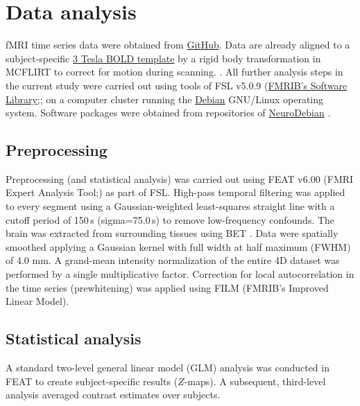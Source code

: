 \documentclass[english]{article}
\begin{document}
\section{Data analysis }
fMRI time series data were obtained from
\href{''https://github.com/psychoinformatics-de/studyforrest-data-aligned''}{GitHub}. Data are already aligned to a subject-specific \href{''https://github.com/psychoinformatics-de/studyforrest-data-templatetransforms''}{3 Tesla BOLD template} by a rigid body transformation in MCFLIRT \citep{jenkinson2002registration} to correct for motion during scanning.
\citep{sengupta2016extension}.
All further analysis steps in the current study were carried out using tools of FSL v5.0.9 (\href{''https://www.fmrib.ox.ac.uk/fsl''}{FMRIB's Software Library};\citep{smith2004fsl}; on a computer cluster running the \href{https://www.debian.org}{Debian} GNU/Linux operating system. Software packages were obtained from repositories of \href{http://neuro.debian.net}{NeuroDebian} \citep{halchenko2012open}.

\subsection{Preprocessing}
Preprocessing (and statistical analysis) was carried out using FEAT v6.00 (FMRI Expert Analysis Tool;\citep{woolrich2001autocorr}) as part of FSL.
High-pass temporal filtering was applied to every segment using a Gaussian-weighted least-squares straight line with a cutoff period of 150\,s (sigma=75.0\,s) to remove low-frequency confounds.
The brain was extracted from surrounding tissues using BET \citep{smith2002bet}.
Data were spatially smoothed applying a Gaussian kernel with full width at half maximum (FWHM) of 4.0 mm.
A grand-mean intensity normalization of the entire 4D dataset was performed by a single multiplicative factor.
Correction for local autocorrelation in the time series (prewhitening) was applied using FILM (FMRIB’s Improved Linear Model).

\subsection{Statistical analysis}
A standard two-level general linear model (GLM) analysis was conducted in FEAT to create subject-specific results ($Z$-maps). A subsequent, third-level analysis averaged contrast estimates over subjects.
\end{document}
